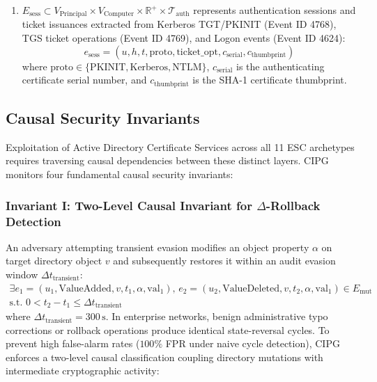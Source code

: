 \begin{definition}
\begin{enumerate}
    where $u$ is the requesting identity, $\text{ca}$ is the issuing CA, $t_{\text{tpl}}$ is the invoked template, $c_{\text{serial}}$ is the issued certificate serial number, $\text{req\_id}$ is the CA request identifier, $\text{skid}$ is the X.509 Subject Key Identifier, and $\text{SAN}$ is the explicit Subject Alternative Name claim.
    \item $E_{\text{sess}} \subset V_{\text{Principal}} \times V_{\text{Computer}} \times \mathbb{R}^+ \times \mathcal{T}_{\text{auth}}$ represents authentication sessions and ticket issuances extracted from Kerberos TGT/PKINIT (Event ID 4768), TGS ticket operations (Event ID 4769), and Logon events (Event ID 4624):
    \begin{equation}
    e_{\text{sess}} = (u, h, t, \text{proto}, \text{ticket\_opt}, c_{\text{serial}}, c_{\text{thumbprint}})
    \end{equation}
    where $\text{proto} \in \{\text{PKINIT}, \text{Kerberos}, \text{NTLM}\}$, $c_{\text{serial}}$ is the authenticating certificate serial number, and $c_{\text{thumbprint}}$ is the SHA-1 certificate thumbprint.
\end{enumerate}
\end{definition}

\subsection{Causal Security Invariants}
Exploitation of Active Directory Certificate Services across all 11 ESC archetypes requires traversing causal dependencies between these distinct layers. CIPG monitors four fundamental causal security invariants:

\subsubsection{Invariant I: Two-Level Causal Invariant for $\Delta$-Rollback Detection}
An adversary attempting transient evasion modifies an object property $\alpha$ on target directory object $v$ and subsequently restores it within an audit evasion window $\Delta t_{\text{transient}}$:
\begin{equation}
\begin{aligned}
\exists e_1 = (u_1, \text{ValueAdded}, v, t_1, \alpha, \text{val}_1), \, e_2 = (u_2, \text{ValueDeleted}, v, t_2, \alpha, \text{val}_1) \in E_{\text{mut}} \\
\text{s.t. } 0 < t_2 - t_1 \le \Delta t_{\text{transient}}
\end{aligned}
\end{equation}
where $\Delta t_{\text{transient}} = 300\,\text{s}$. In enterprise networks, benign administrative typo corrections or rollback operations produce identical state-reversal cycles. To prevent high false-alarm rates ($100\%$ FPR under naive cycle detection), CIPG enforces a two-level causal classification coupling directory mutations with intermediate cryptographic activity:

